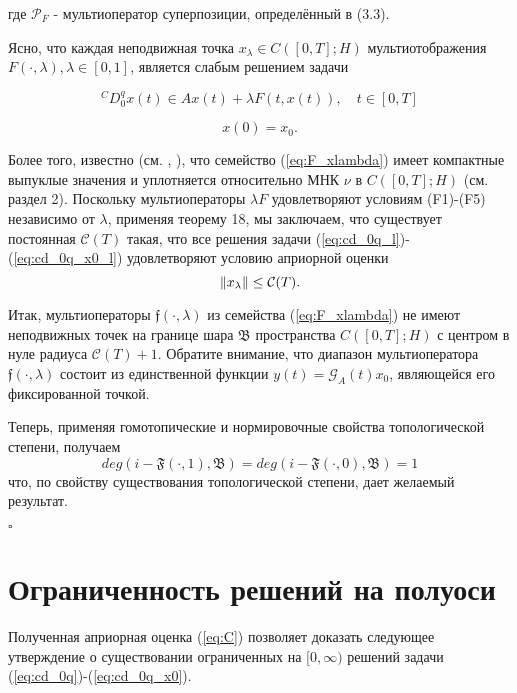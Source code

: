 \noindent где $\mathcal{P}_F$ - мультиоператор суперпозиции, определённый в (3.3).

Ясно, что каждая неподвижная точка $x_{\lambda} \in C([0, T]; H)$ мультиотображения $F (\cdot, \lambda), \lambda \in [0, 1]$,
является слабым решением задачи

\begin{equation}
    \label{eq:cd_0q_l}
    {}^CD_{0}^{q}x(t) \in Ax(t) + \lambda F(t, x(t)), \quad t \in [0, T]
\end{equation}

\begin{equation}
    \label{eq:cd_0q_x0_l}
    x(0) = x_0.
\end{equation}

Более того, известно (см. \cite{kamenskii_fpta19}, \cite{kamenskii_m}), что семейство (\ref{eq:F_xlambda}) имеет компактные выпуклые значения и уплотняется относительно
МНК $\nu$ в $C([0, T]; H)$ (см. раздел 2). Поскольку мультиоператоры $\lambda F$ удовлетворяют условиям (F1)-(F5) независимо от $\lambda$,
применяя теорему 18, мы заключаем, что существует постоянная $\mathcal{C}(T)$ такая, что все решения задачи
(\ref{eq:cd_0q_l})-(\ref{eq:cd_0q_x0_l}) удовлетворяют условию априорной оценки
$$\lVert x_{\lambda}\rVert \leq \mathcal{C}(T).$$

\noindent Итак, мультиоператоры $\mathfrak{f}(\cdot, \lambda)$ из семейства (\ref{eq:F_xlambda}) не имеют неподвижных точек на границе шара
$\mathfrak{B}$ пространства $C([0, T]; H)$ с центром в нуле радиуса $\mathcal{C}(T) + 1$. Обратите внимание, что диапазон мультиоператора
$\mathfrak{f}(\cdot, \lambda)$ состоит из единственной функции $y(t) = \mathcal{G}_A(t)x_0$, являющейся его фиксированной точкой.

Теперь, применяя гомотопические и нормировочные свойства топологической степени, получаем
$$deg(i - \mathfrak{F}(\cdot, 1), \mathfrak{B}) = deg(i - \mathfrak{F}(\cdot, 0), \mathfrak{B}) = 1$$
что, по свойству существования топологической степени, дает желаемый результат.

\begin{flushright}
    $\square$
\end{flushright}

\section{Ограниченность решений на полуоси}

Полученная априорная оценка (\ref{eq:C}) позволяет доказать следующее утверждение о существовании ограниченных на $[0, \infty)$ решений задачи
(\ref{eq:cd_0q})-(\ref{eq:cd_0q_x0}).

